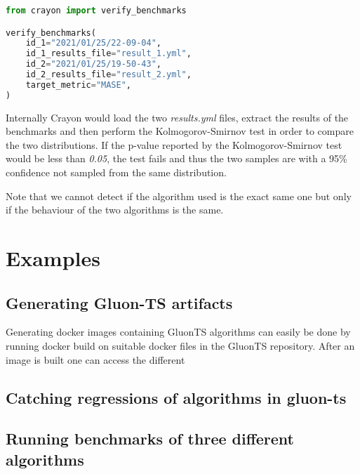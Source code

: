 \begin{lstlisting}[language=Python, label={code:verify}, caption=Python code to verify whether two benchmarks are of the same algorithm.]
from crayon import verify_benchmarks

verify_benchmarks(
    id_1="2021/01/25/22-09-04",
    id_1_results_file="result_1.yml", 
    id_2="2021/01/25/19-50-43",
    id_2_results_file="result_2.yml",
    target_metric="MASE",
)
\end{lstlisting}

Internally Crayon would load the two \textit{results.yml} files, extract the results of the benchmarks and then perform the Kolmogorov-Smirnov test in order to compare the two distributions. If the p-value reported by the Kolmogorov-Smirnov test would be less than \textit{0.05}, the test fails and thus the two samples are with a 95\% confidence not sampled from the same distribution. 

Note that we cannot detect if the algorithm used is the exact same one but only if the behaviour of the two algorithms is the same.

\section{Examples}
\subsection{Generating Gluon-TS artifacts}
Generating docker images containing GluonTS algorithms can easily be done by running docker build on suitable docker files in the GluonTS repository. After an image is built one can access the different 
\subsection{Catching regressions of algorithms in gluon-ts}
\subsection{Running benchmarks of three different algorithms}



